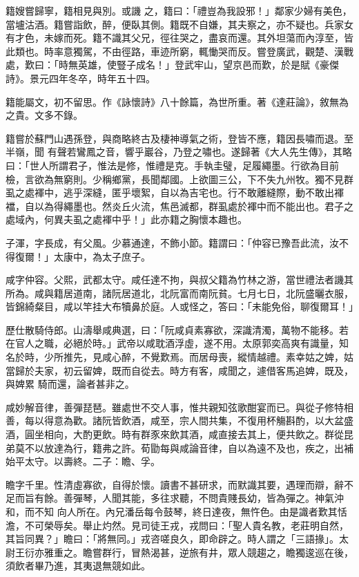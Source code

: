 \begin{pinyinscope}
 籍嫂嘗歸寧，籍相見與別。或譏
 之，籍曰：「禮豈為我設邪！」鄰家少婦有美色，當壚沽酒。籍嘗詣飲，醉，便臥其側。籍既不自嫌，其夫察之，亦不疑也。兵家女有才色，未嫁而死。籍不識其父兄，徑往哭之，盡哀而還。其外坦蕩而內淳至，皆此類也。時率意獨駕，不由徑路，車迹所窮，輒慟哭而反。嘗登廣武，觀楚、漢戰處，歎曰：「時無英雄，使豎子成名！」登武牢山，望京邑而歎，於是賦《豪傑詩》。景元四年冬卒，時年五十四。



 籍能屬文，初不留思。作《詠懷詩》八十餘篇，為世所重。著《達莊論》，敘無為之貴。文多不錄。



 籍嘗於蘇門山遇孫登，與商略終古及棲神導氣之術，登皆不應，籍因長嘯而退。至半嶺，聞
 有聲若鸞鳳之音，響乎巖谷，乃登之嘯也。遂歸著《大人先生傳》，其略曰：「世人所謂君子，惟法是修，惟禮是克。手執圭璧，足履繩墨。行欲為目前檢，言欲為無窮則。少稱鄉黨，長聞鄰國。上欲圖三公，下不失九州牧。獨不見群虱之處褌中，逃乎深縫，匿乎壞絮，自以為吉宅也。行不敢離縫際，動不敢出褌襠，自以為得繩墨也。然炎丘火流，焦邑滅都，群虱處於褌中而不能出也。君子之處域內，何異夫虱之處褌中乎！」此亦籍之胸懷本趣也。



 子渾，字長成，有父風。少慕通達，不飾小節。籍謂曰：「仲容已豫吾此流，汝不得復爾！」太康中，為太子庶子。



 咸字仲容。父熙，武都太守。咸任達不拘，與叔父籍為竹林之游，當世禮法者譏其所為。咸與籍居道南，諸阮居道北，北阮富而南阮貧。七月七日，北阮盛曬衣服，皆錦綺粲目，咸以竿挂大布犢鼻於庭。人或怪之，答曰：「未能免俗，聊復爾耳！」



 歷仕散騎侍郎。山濤舉咸典選，曰：「阮咸貞素寡欲，深識清濁，萬物不能移。若在官人之職，必絕於時。」武帝以咸耽酒浮虛，遂不用。太原郭奕高爽有識量，知名於時，少所推先，見咸心醉，不覺歎焉。而居母喪，縱情越禮。素幸姑之婢，姑當歸於夫家，初云留婢，既而自從去。時方有客，咸聞之，遽借客馬追婢，既及，與婢累
 騎而還，論者甚非之。



 咸妙解音律，善彈琵琶。雖處世不交人事，惟共親知弦歌酣宴而已。與從子修特相善，每以得意為歡。諸阮皆飲酒，咸至，宗人間共集，不復用杯觴斟酌，以大盆盛酒，圓坐相向，大酌更飲。時有群豕來飲其酒，咸直接去其上，便共飲之。群從昆弟莫不以放達為行，籍弗之許。荀勖每與咸論音律，自以為遠不及也，疾之，出補始平太守。以壽終。二子：瞻、孚。



 瞻字千里。性清虛寡欲，自得於懷。讀書不甚研求，而默識其要，遇理而辯，辭不足而旨有餘。善彈琴，人聞其能，多往求聽，不問貴賤長幼，皆為彈之。神氣沖和，而不知
 向人所在。內兄潘岳每令鼓琴，終日達夜，無忤色。由是識者歎其恬澹，不可榮辱矣。舉止灼然。見司徒王戎，戎問曰：「聖人貴名教，老莊明自然，其旨同異？」瞻曰：「將無同。」戎咨嗟良久，即命辟之。時人謂之「三語掾」。太尉王衍亦雅重之。瞻嘗群行，冒熱渴甚，逆旅有井，眾人競趨之，瞻獨逡巡在後，須飲者畢乃進，其夷退無競如此。




\end{pinyinscope}
